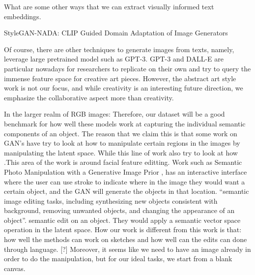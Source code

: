 What are some other ways that we can extract visually informed text embeddings. 

StyleGAN-NADA: CLIP Guided Domain Adaptation of Image Generators

Of course, there are other techniques to generate images from texts, namely, leverage large pretrained model such as GPT-3. GPT-3 and DALL-E are particular nowadays for researchers to replicate on their own and try to query the immense feature space for creative art pieces. However, the abstract art style work is not our focus, and while creativity is an interesting future direction, we emphasize the collaborative aspect more than creativity. 

In the larger realm of RGB images:
Therefore, our dataset will be a good benchmark for how well these models work at capturing the individual semantic components of an object. The reason that we claim this is that some work on GAN's have try to look at how to manipulate certain regions in the images by manipulating the latent space. While this line of work also try to look at how .This area of the work is around facial feature editting. Work such as Semantic Photo Manipulation with a Generative Image Prior \citep{Bau:Ganpaint:2019}, has an interactive interface where the user can use stroke to indicate where in the image they would want a certain object, and the GAN will generate the objects in that location. ``semantic image editing tasks, including synthesizing new objects consistent with background, removing unwanted objects, and changing the appearance of an object''. semantic edit on an object. They would apply a semantic vector space operation in the latent space. How our work is different from this work is that: how well the methods can work on sketches and how well can the edits can done through language. [?] Moreover, it seems like we need to have an image already in order to do the manipulation, but for our ideal tasks, we start from a blank canvas.

